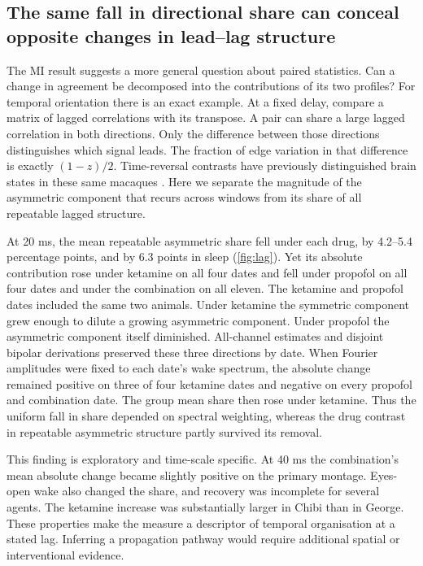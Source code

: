 \subsection{The same fall in directional share can conceal opposite changes in lead--lag structure}

The MI result suggests a more general question about paired statistics. Can a change in agreement be decomposed into the contributions of its two profiles? For temporal orientation there is an exact example. At a fixed delay, compare a matrix of lagged correlations with its transpose. A pair can share a large lagged correlation in both directions. Only the difference between those directions distinguishes which signal leads. The fraction of edge variation in that difference is exactly $(1-z)/2$. Time-reversal contrasts have previously distinguished brain states in these same macaques \cite{deco2022}. Here we separate the magnitude of the asymmetric component that recurs across windows from its share of all repeatable lagged structure.

At 20 ms, the mean repeatable asymmetric share fell under each drug, by 4.2--5.4 percentage points, and by 6.3 points in sleep (\cref{fig:lag}). Yet its absolute contribution rose under ketamine on all four dates and fell under propofol on all four dates and under the combination on all eleven. The ketamine and propofol dates included the same two animals. Under ketamine the symmetric component grew enough to dilute a growing asymmetric component. Under propofol the asymmetric component itself diminished. All-channel estimates and disjoint bipolar derivations preserved these three directions by date. When Fourier amplitudes were fixed to each date's wake spectrum, the absolute change remained positive on three of four ketamine dates and negative on every propofol and combination date. The group mean share then rose under ketamine. Thus the uniform fall in share depended on spectral weighting, whereas the drug contrast in repeatable asymmetric structure partly survived its removal.

This finding is exploratory and time-scale specific. At 40 ms the combination's mean absolute change became slightly positive on the primary montage. Eyes-open wake also changed the share, and recovery was incomplete for several agents. The ketamine increase was substantially larger in Chibi than in George. These properties make the measure a descriptor of temporal organisation at a stated lag. Inferring a propagation pathway would require additional spatial or interventional evidence.

